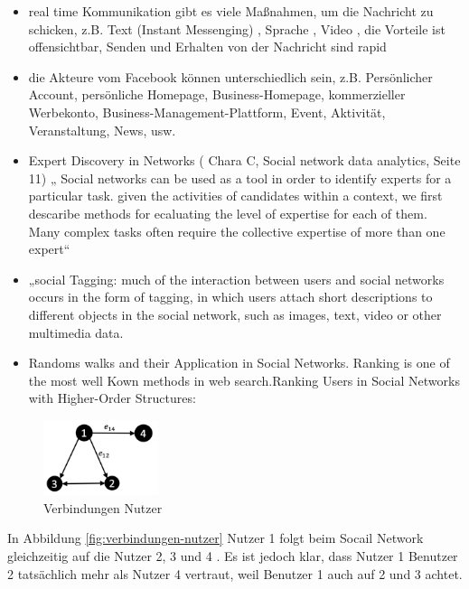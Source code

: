 \begin{itemize}
\item real time Kommunikation gibt es viele Maßnahmen, um die Nachricht zu schicken, z.B. Text (Instant Messenging) , Sprache , Video , die Vorteile ist offensichtbar,  Senden und Erhalten von der Nachricht sind rapid
\item die Akteure vom Facebook können unterschiedlich sein, z.B. Persönlicher Account, persönliche Homepage, Business-Homepage, kommerzieller Werbekonto, Business-Management-Plattform, Event, Aktivität, Veranstaltung, News, usw.
\item Expert Discovery in Networks ( Chara C, Social network data analytics, Seite 11) „ Social networks can be used as a tool in order to identify experts for a particular task. given the activities of candidates within a context, we first descaribe methods for ecaluating the level of expertise for each of them. Many complex tasks often require the collective expertise of more than one expert“
\item „social Tagging:  much of the interaction between users and social networks occurs in the form of tagging, in which users attach short descriptions to different objects in the social network, such as images, text, video or other multimedia data.
\item Randoms walks and their Application in Social Networks. Ranking is one of the most well Kown methods in web search.Ranking Users in Social Networks with Higher-Order Structures:
\end{itemize}


\begin{figure}
	\centering
	\includegraphics[width=0.3\textwidth]{bilder/social-network-users.png}
	\caption{Verbindungen Nutzer}
	\label{fig:verbindungen-nutzer}
\end{figure}

In Abbildung \vref{fig:verbindungen-nutzer} Nutzer 1 folgt beim Socail Network  gleichzeitig auf die Nutzer 2, 3 und 4 . Es ist jedoch klar, dass Nutzer 1 Benutzer 2 tatsächlich mehr  als Nutzer 4 vertraut, weil Benutzer 1 auch auf 2 und 3 achtet.

